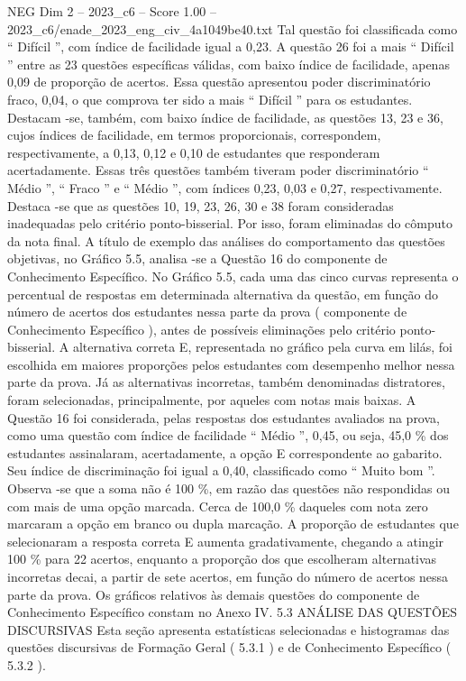 \begin{textsample}{NEG Dim 2 – 2023\_c6 – Score 1.00 – 2023\_c6/enade\_2023\_eng\_civ\_4a1049be40.txt}
Tal questão foi classificada como “ Difícil ”, com índice de facilidade igual a 0,23.
A questão 26 foi a mais “ Difícil ” entre as 23 questões específicas válidas, com baixo índice de facilidade, apenas 0,09 de proporção de acertos.
Essa questão apresentou poder discriminatório fraco, 0,04, o que comprova ter sido a mais “ Difícil ” para os estudantes.
Destacam -se, também, com baixo índice de facilidade, as questões 13, 23 e 36, cujos índices de facilidade, em termos proporcionais, correspondem, respectivamente, a 0,13, 0,12 e 0,10 de estudantes que responderam acertadamente.
Essas três questões também tiveram poder discriminatório “ Médio ”, “ Fraco ” e “ Médio ”, com índices 0,23, 0,03 e 0,27, respectivamente.
Destaca -se que as questões 10, 19, 23, 26, 30 e 38 foram consideradas inadequadas pelo critério ponto-bisserial.
Por isso, foram eliminadas do cômputo da nota final.
A título de exemplo das análises do comportamento das questões objetivas, no Gráfico 5.5, analisa -se a Questão 16 do componente de Conhecimento Específico.
No Gráfico 5.5, cada uma das cinco curvas representa o percentual de respostas em determinada alternativa da questão, em função do número de acertos dos estudantes nessa parte da prova ( componente de Conhecimento Específico ), antes de possíveis eliminações pelo critério ponto-bisserial.
A alternativa correta E, representada no gráfico pela curva em lilás, foi escolhida em maiores proporções pelos estudantes com desempenho melhor nessa parte da prova.
Já as alternativas incorretas, também denominadas distratores, foram selecionadas, principalmente, por aqueles com notas mais baixas.
A Questão 16 foi considerada, pelas respostas dos estudantes avaliados na prova, como uma questão com índice de facilidade “ Médio ”, 0,45, ou seja, 45,0 \% dos estudantes assinalaram, acertadamente, a opção E correspondente ao gabarito.
Seu índice de discriminação foi igual a 0,40, classificado como “ Muito bom ”.
Observa -se que a soma não é 100 \%, em razão das questões não respondidas ou com mais de uma opção marcada.
Cerca de 100,0 \% daqueles com nota zero marcaram a opção em branco ou dupla marcação.
A proporção de estudantes que selecionaram a resposta correta E aumenta gradativamente, chegando a atingir 100 \% para 22 acertos, enquanto a proporção dos que escolheram alternativas incorretas decai, a partir de sete acertos, em função do número de acertos nessa parte da prova.
Os gráficos relativos às demais questões do componente de Conhecimento Específico constam no Anexo IV. 5.3 ANÁLISE DAS QUESTÕES DISCURSIVAS Esta seção apresenta estatísticas selecionadas e histogramas das questões discursivas de Formação Geral ( 5.3.1 ) e de Conhecimento Específico ( 5.3.2 ).

\end{textsample}
